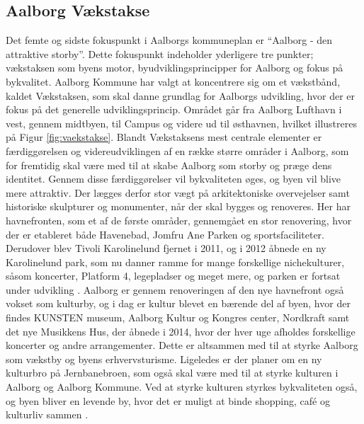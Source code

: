 \subsection{Aalborg Vækstakse}
Det femte og sidste fokuspunkt i Aalborgs kommuneplan er “Aalborg - den attraktive storby”. Dette fokuspunkt indeholder yderligere tre punkter; vækstaksen som byens motor, byudviklingsprincipper for Aalborg og fokus på bykvalitet. 
\newline
\newline
Aalborg Kommune har valgt at koncentrere sig om et vækstbånd, kaldet Vækstaksen, som skal danne grundlag for Aalborgs udvikling, hvor der er fokus på det generelle udviklingsprincip. Området går fra Aalborg Lufthavn i vest, gennem midtbyen, til Campus og videre ud til østhavnen, hvilket illustreres på Figur \ref{fig:vaekstakse}. 
\newline \indent{     }  Blandt Vækstaksens mest centrale elementer er færdiggørelsen og videreudviklingen af en række større områder i Aalborg, som for fremtidig skal være med til at skabe Aalborg som storby og præge dens identitet. Gennem disse færdiggørelser vil bykvaliteten øges, og byen vil blive mere attraktiv. Der lægges derfor stor vægt på arkitektoniske overvejelser samt historiske skulpturer og monumenter, når der skal bygges og renoveres. 
\newline \indent{     }  Her har havnefronten, som et af de første områder, gennemgået en stor renovering, hvor der er etableret både Havenebad, Jomfru Ane Parken og sportsfaciliteter. Derudover blev Tivoli Karolinelund fjernet i 2011, og i 2012 åbnede en ny Karolinelund park, som nu danner ramme for mange forskellige nichekulturer, såsom koncerter, Platform 4, legepladser og meget mere, og parken er fortsat under udvikling \citep{jomfruaneparken} \citep{karolinelund}. 
\newline \indent{     }  Aalborg er gennem renoveringen af den nye havnefront også vokset som kulturby, og i dag er kultur blevet en bærende del af byen, hvor der findes KUNSTEN museum, Aalborg Kultur og Kongres center, Nordkraft samt det nye Musikkens Hus, der åbnede i 2014, hvor der hver uge afholdes forskellige koncerter og andre arrangementer. Dette er altsammen med til at styrke Aalborg som vækstby og byens erhvervsturisme. Ligeledes er der planer om en ny kulturbro på Jernbanebroen, som også skal være med til at styrke kulturen i Aalborg og Aalborg Kommune. Ved at styrke kulturen styrkes bykvaliteten også, og byen bliver en levende by, hvor det er muligt at binde shopping, café og kulturliv sammen \citep{kulturbro} \citep{musikkenshus}.
